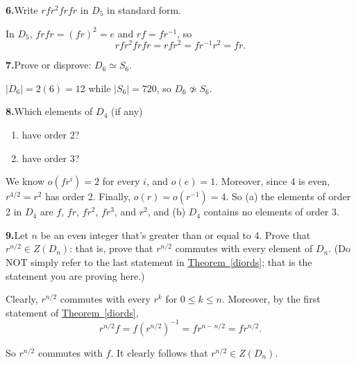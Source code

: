 \documentclass[10pt,]{book}
\theoremstyle{plain}
\theoremstyle{definition}
\theoremstyle{definition}
\theoremstyle{definition}
\theoremstyle{definition}
\numberwithin{equation}{section}
\begin{document}
\par\smallskip
\noindent\textbf{6.}\quad{}Write \(rfr^2frfr\) in \(D_5\) in standard form.%
\par\smallskip
In \(D_5\), \(frfr=(fr)^2=e\) and \(rf=fr^{-1}\), so%
\begin{equation*}
rfr^2frfr=rfr^2=fr^{-1}r^2=fr.
\end{equation*}
%
\par\smallskip
\noindent\textbf{7.}\quad{}Prove or disprove: \(D_6\simeq S_6\).%
\par\smallskip
\(|D_6|=2(6)=12\) while \(|S_6|=720\), so \(D_6\not\simeq S_6\).%
\par\smallskip
\noindent\textbf{8.}\quad{}Which elements of \(D_4\) (if any) \leavevmode%
\begin{enumerate}[label=(\alph*)]
\item\hypertarget{li-371}{}have order 2?%
\item\hypertarget{li-372}{}have order \(3\)?%
\end{enumerate}
%
\par\smallskip
We know \(o(fr^i)=2\) for every \(i\), and \(o(e)=1\). Moreover, since \(4\) is even, \(r^{4/2}=r^2\) has order 2. Finally, \(o(r)=o(r^{-1})=4\). So (a) the elements of order 2 in \(D_4\) are \(f\), \(fr\), \(fr^2\), \(fr^3\), and \(r^2\), and (b) \(D_4\) contains no elements of order 3.%
\par\smallskip
\noindent\textbf{9.}\quad{}Let \(n\) be an even integer that's greater than or equal to 4. Prove that \(r^{n/2}\in Z(D_n)\): that is, prove that \(r^{n/2}\) commutes with every element of \(D_n\). (Do NOT simply refer to the last statement in \hyperref[diords]{Theorem~\ref{diords}}; that is the statement you are proving here.)%
\par\smallskip
Clearly, \(r^{n/2}\) commutes with every \(r^k\) for \(0\leq k\leq n\). Moreover, by the first statement of \hyperref[diords]{Theorem~\ref{diords}},%
\begin{equation*}
r^{n/2}f=f(r^{n/2})^{-1}=fr^{n-n/2}=fr^{n/2}.
\end{equation*}
%
\par
So \(r^{n/2}\) commutes with \(f\). It clearly follows that \(r^{n/2}\in Z(D_n)\).%
\par\smallskip
\end{document}
